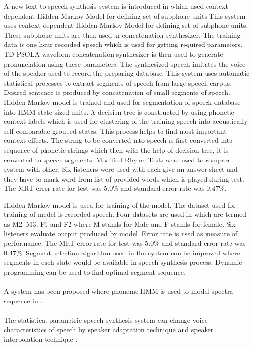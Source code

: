 A new text to speech synthesis system is introduced in \cite{donovan1995improvements} which used context-dependent Hidden Markov Model
for defining set of subphone units This system uses context-dependent Hidden Markov Model for defining set of subphone units. These subphone units are then used in concatenation synthesizer. The training data is one hour recorded speech which is used for getting required parameters. TD-PSOLA waveform concatenation synthesizer is then used to generate pronunciation using these parameters. The synthesized speech imitates the voice of the speaker used to record the preparing database. This system uses automatic statistical processes to extract segments of speech from large speech carpus. Desired sentence is produced by concatenation of small
segments of speech. Hidden Markov model is trained and used for segmentation of speech database into HMM-state-sized
units. A decision tree is constructed by using phonetic context labels which is used for clustering of the training speech into
acoustically self-comparable grouped states. This process helps to find most important context effects. The string to be
converted into speech is first converted into sequence of phonetic strings which then with the help of decision tree, it is
converted to speech segments. Modified Rhyme Tests \cite{house1965articulation} were used to compare system
with other. Six listeners were used with each give an answer sheet and they have to mark word from list of provided words
which is played during test. The MRT error rate for test was 5.0\% and standard error rate was 0.47\%.


Hidden Markov model is used for training of the model. The dataset used for training of model is recorded speech. Four datasets are used in which are termed as M2, M3, F1 and F2 where M stands for Male and F stands for female. Six listeners evaluate output produced by model. Error rate is used as measure of performance. 
The MRT error rate for test was 5.0\% and standard error rate was 0.47\%. Segment selection algorithm used in the system can be improved where segments in each state would be available in speech synthesis process. Dynamic programming can be used to find optimal segment sequence.
\\ \\
A system has been proposed where phoneme HMM is used to model spectra sequence in \cite{masuko1996speech}.
\\ \\
The statistical parametric speech synthesis system can change voice characteristics of speech by speaker adaptation technique \cite{tamura1998speaker} and speaker interpolation technique \cite{yoshimura2001speaker}.

